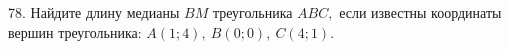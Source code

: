 78. Найдите длину медианы $BM$ треугольника $ABC,$ если известны координаты вершин треугольника: $A(1;4),\ B(0;0),\ C(4;1).$\\
